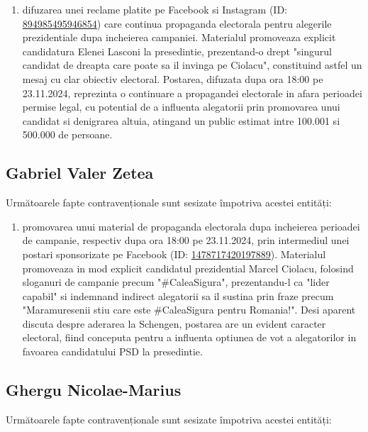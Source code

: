 \documentclass[a4paper,12pt]{article}
\begin{document}
\begin{enumerate}[leftmargin=*, label=\arabic*.)]
    \item difuzarea unei reclame platite pe Facebook si Instagram (ID: \href{https://www.facebook.com/ads/library/?id=894985495946854}{894985495946854}) care continua propaganda electorala pentru alegerile prezidentiale dupa incheierea campaniei. Materialul promoveaza explicit candidatura Elenei Lasconi la presedintie, prezentand-o drept "singurul candidat de dreapta care poate sa il invinga pe Ciolacu", constituind astfel un mesaj cu clar obiectiv electoral. Postarea, difuzata dupa ora 18:00 pe 23.11.2024, reprezinta o continuare a propagandei electorale in afara perioadei permise legal, cu potential de a influenta alegatorii prin promovarea unui candidat si denigrarea altuia, atingand un public estimat intre 100.001 si 500.000 de persoane.
\end{enumerate}

\vspace{0.5cm}

\subsection{Gabriel Valer Zetea}
Următoarele fapte contravenționale sunt sesizate împotriva acestei entități:

\begin{enumerate}[leftmargin=*, label=\arabic*.)]
    \item promovarea unui material de propaganda electorala dupa incheierea perioadei de campanie, respectiv dupa ora 18:00 pe 23.11.2024, prin intermediul unei postari sponsorizate pe Facebook (ID: \href{https://www.facebook.com/ads/library/?id=1478717420197889}{1478717420197889}). Materialul promoveaza in mod explicit candidatul prezidential Marcel Ciolacu, folosind sloganuri de campanie precum "\#CaleaSigura", prezentandu-l ca "lider capabil" si indemnand indirect alegatorii sa il sustina prin fraze precum "Maramuresenii stiu care este \#CaleaSigura pentru Romania!". Desi aparent discuta despre aderarea la Schengen, postarea are un evident caracter electoral, fiind conceputa pentru a influenta optiunea de vot a alegatorilor in favoarea candidatului PSD la presedintie.
\end{enumerate}

\vspace{0.5cm}

\subsection{Ghergu Nicolae-Marius}
Următoarele fapte contravenționale sunt sesizate împotriva acestei entități:
\end{document}
